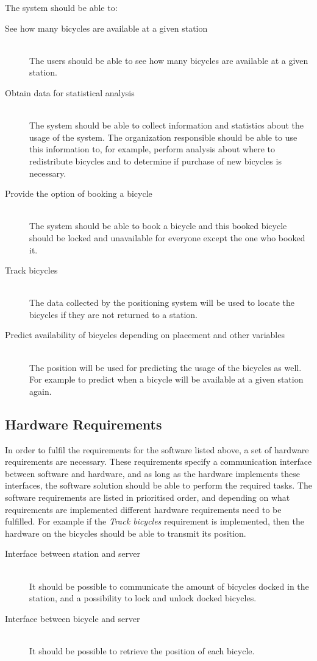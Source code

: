 The system should be able to:
\begin{description}
\item[See how many bicycles are available at a given station] \hfill \\
The users should be able to see how many bicycles are available at a given station.
\item[Obtain data for statistical analysis] \hfill \\
The system should be able to collect information and statistics about the usage of the system.
The organization responsible should be able to use this information to, for example, perform analysis about where to redistribute bicycles and to determine if purchase of new bicycles is necessary.
\item[Provide the option of booking a bicycle] \hfill \\
The system should be able to book a bicycle and this booked bicycle should be locked and unavailable for everyone except the one who booked it.
\item[Track bicycles] \hfill \\
The data collected by the positioning system will be used to locate the bicycles if they are not returned to a station.
\item[Predict availability of bicycles depending on placement and other variables] \hfill \\
The position will be used for predicting the usage of the bicycles as well. 
For example to predict when a bicycle will be available at a given station again.
\end{description}

\subsection{Hardware Requirements}
In order to fulfil the requirements for the software listed above, a set of hardware requirements are necessary.
These requirements specify a communication interface between software and hardware, and as long as the hardware implements these interfaces, the software solution should be able to perform the required tasks.
The software requirements are listed in prioritised order, and depending on what requirements are implemented different hardware requirements need to be fulfilled. 
For example if the \textit{Track bicycles} requirement is implemented, then the hardware on the bicycles should be able to transmit its position.
\begin{description}
	\item[Interface between station and server]\hfill \\
	It should be possible to communicate the amount of bicycles docked in the station, and a possibility to lock and unlock docked bicycles.
	\item[Interface between bicycle and server]\hfill \\
	It should be possible to retrieve the position of each bicycle.
\end{description}